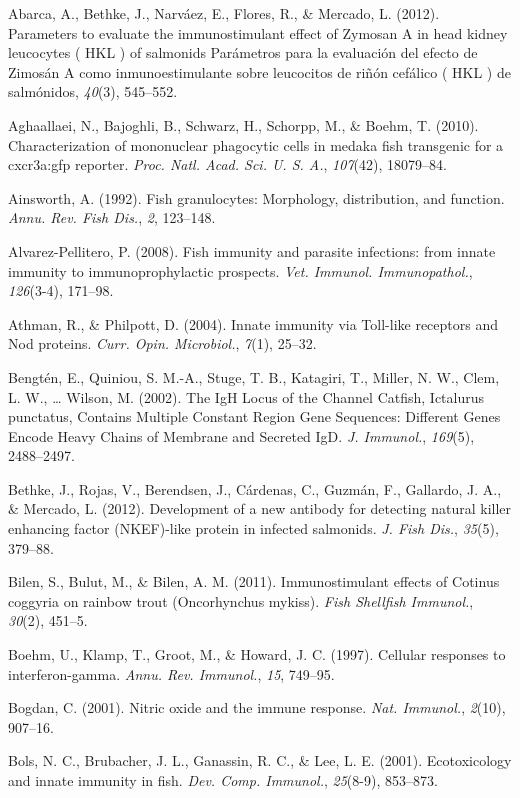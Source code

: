 \documentclass[12pt,a4paper,oneside]{scrbook}
\begin{document}
Abarca, A., Bethke, J., Narváez, E., Flores, R., \& Mercado, L. (2012).
Parameters to evaluate the immunostimulant effect of Zymosan A in head
kidney leucocytes ( HKL ) of salmonids Parámetros para la evaluación del
efecto de Zimosán A como inmunoestimulante sobre leucocitos de riñón
cefálico ( HKL ) de salmónidos, \emph{40}(3), 545--552.

Aghaallaei, N., Bajoghli, B., Schwarz, H., Schorpp, M., \& Boehm, T.
(2010). Characterization of mononuclear phagocytic cells in medaka fish
transgenic for a cxcr3a:gfp reporter. \emph{Proc. Natl. Acad. Sci. U. S.
A.}, \emph{107}(42), 18079--84.

Ainsworth, A. (1992). Fish granulocytes: Morphology, distribution, and
function. \emph{Annu. Rev. Fish Dis.}, \emph{2}, 123--148.

Alvarez-Pellitero, P. (2008). Fish immunity and parasite infections:
from innate immunity to immunoprophylactic prospects. \emph{Vet.
Immunol. Immunopathol.}, \emph{126}(3-4), 171--98.

Athman, R., \& Philpott, D. (2004). Innate immunity via Toll-like
receptors and Nod proteins. \emph{Curr. Opin. Microbiol.}, \emph{7}(1),
25--32.

Bengtén, E., Quiniou, S. M.-A., Stuge, T. B., Katagiri, T., Miller, N.
W., Clem, L. W., \ldots{} Wilson, M. (2002). The IgH Locus of the
Channel Catfish, Ictalurus punctatus, Contains Multiple Constant Region
Gene Sequences: Different Genes Encode Heavy Chains of Membrane and
Secreted IgD. \emph{J. Immunol.}, \emph{169}(5), 2488--2497.

Bethke, J., Rojas, V., Berendsen, J., Cárdenas, C., Guzmán, F.,
Gallardo, J. A., \& Mercado, L. (2012). Development of a new antibody
for detecting natural killer enhancing factor (NKEF)-like protein in
infected salmonids. \emph{J. Fish Dis.}, \emph{35}(5), 379--88.

Bilen, S., Bulut, M., \& Bilen, A. M. (2011). Immunostimulant effects of
Cotinus coggyria on rainbow trout (Oncorhynchus mykiss). \emph{Fish
Shellfish Immunol.}, \emph{30}(2), 451--5.

Boehm, U., Klamp, T., Groot, M., \& Howard, J. C. (1997). Cellular
responses to interferon-gamma. \emph{Annu. Rev. Immunol.}, \emph{15},
749--95.

Bogdan, C. (2001). Nitric oxide and the immune response. \emph{Nat.
Immunol.}, \emph{2}(10), 907--16.

Bols, N. C., Brubacher, J. L., Ganassin, R. C., \& Lee, L. E. (2001).
Ecotoxicology and innate immunity in fish. \emph{Dev. Comp. Immunol.},
\emph{25}(8-9), 853--873.
\end{document}
